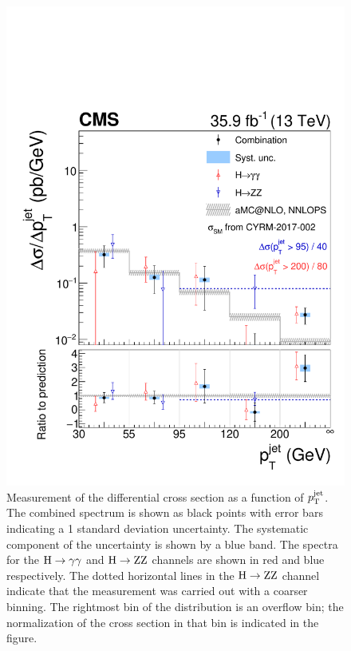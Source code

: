 \begin{figure}[hbtp]
  \begin{center}
    \includegraphics[width=0.49\linewidth]{img/differentials/spectra_ptjet.pdf}
    \caption{
        Measurement of the differential cross section as a function of $p_\mathrm{T}^\text{jet} $. The combined spectrum is shown as black points with error bars indicating a 1 standard deviation uncertainty. The systematic component of the uncertainty is shown by a blue band. The spectra for the $\mathrm{H}\to\mathrm{\gamma}\mathrm{\gamma}$ and $\mathrm{H}\to\mathrm{Z}\mathrm{Z}$ channels are shown in red and blue respectively.
        The dotted horizontal lines in the $\mathrm{H}\to\mathrm{Z}\mathrm{Z}$ channel indicate that the measurement was carried out with a coarser binning.
        The rightmost bin of the distribution is an overflow bin; the normalization of the cross section in that bin is indicated in the figure.
        }
    \label{fig:CombinedSpectra_ptjet}
  \end{center}
\end{figure}
